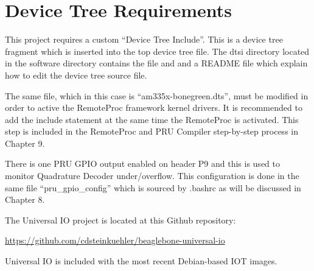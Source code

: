 %
%
%

\chapter{Device Tree Requirements}

This project requires a custom ``Device Tree Include''.  This is a device tree fragment which is inserted into the top device tree file.  The dtsi directory located in the software directory contains the file and and a README file which explain how to edit the device tree source file.

The same file, which in this case is ``am335x-bonegreen.dts'', must be modified in order to active the RemoteProc framework kernel drivers.  It is recommended to add the include statement at the same time the RemoteProc is activated.  This step is included in the RemoteProc and PRU Compiler step-by-step process in Chapter 9.


There is one PRU GPIO output enabled on header P9 and this is used to monitor Quadrature Decoder under/overflow.  This configuration is done in the same file ``pru\_gpio\_config'' which is sourced by .bashrc as will be discussed in Chapter 8.

The Universal IO project is located at this Github repository:

\url{https://github.com/cdsteinkuehler/beaglebone-universal-io}

Universal IO is included with the most recent Debian-based IOT images.





